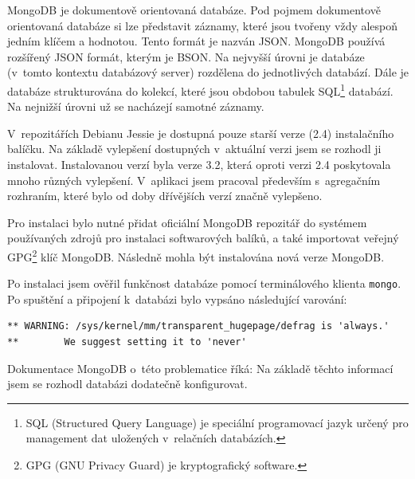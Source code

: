 \documentclass[thesis=M,czech]{FITthesis}[2012/06/26]
\begin{document}
      MongoDB je dokumentově orientovaná databáze.
      Pod pojmem dokumentově orientovaná databáze si lze představit
      záznamy, které jsou tvořeny vždy alespoň jedním klíčem a hodnotou.
      Tento formát je nazván JSON.
      MongoDB používá rozšířený JSON formát, kterým je BSON.
      Na nejvyšší úrovni je databáze (v~tomto kontextu databázový server) rozdělena do jednotlivých databází.
      Dále je databáze strukturována do kolekcí, které jsou obdobou tabulek SQL\footnote{
        SQL (Structured Query Language) je speciální programovací jazyk určený pro management dat uložených v~relačních databázích.
      }
      databází.
      Na nejnižší úrovni už se nacházejí samotné záznamy.

      V~repozitářích Debianu Jessie je dostupná pouze starší verze (2.4) instalačního balíčku.
      Na základě vylepšení dostupných v~aktuální verzi jsem se rozhodl ji instalovat.
      Instalovanou verzí byla verze 3.2, která oproti verzi 2.4 poskytovala mnoho různých vylepšení.
      V~aplikaci jsem pracoval především s~agregačním rozhraním, které bylo od doby dřívějších verzí značně vylepšeno.

      Pro instalaci bylo nutné přidat oficiální MongoDB repozitář do systémem
      používaných zdrojů pro instalaci softwarových balíků, a také importovat veřejný GPG\footnote{
        GPG (GNU Privacy Guard) je kryptografický software.
      }
      klíč MongoDB.
      Následně mohla být instalována nová verze MongoDB.

      Po instalaci jsem ověřil funkčnost databáze pomocí terminálového klienta \verb|mongo|.
      Po spuštění a připojení k~databázi bylo vypsáno následující varování:
      \begin{verbatim}
** WARNING: /sys/kernel/mm/transparent_hugepage/defrag is 'always.'
**        We suggest setting it to 'never'
      \end{verbatim}
      Dokumentace MongoDB o~této problematice říká: \cite{mongo_thp}
      Na základě těchto informací jsem se rozhodl databázi dodatečně konfigurovat.
      
\end{document}
